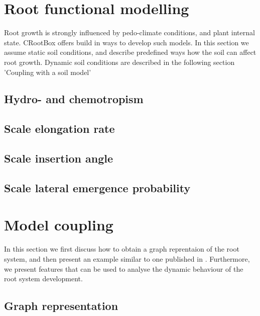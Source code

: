 \documentclass[a4paper]{article}
\begin{document}
\section{Root functional modelling}

Root growth is strongly influenced by pedo-climate conditions, and plant internal state. 
CRootBox offers build in ways to develop such models. 
In this section we assume static soil conditions, and describe predefined ways how the soil can affect root growth.
Dynamic soil conditions are described in the following section 'Coupling with a soil model'

\subsection{Hydro- and chemotropism}



\subsection{Scale elongation rate}



\subsection{Scale insertion angle}

\subsection{Scale lateral emergence probability}



\section{Model coupling}

In this section we first discuss how to obtain a graph reprentaion of the root system, and then present an example similar to one published in \cite{}. 
Furthermore, we present features that can be used to analyse the dynamic behaviour of the root system development.

\subsection{Graph representation}
\end{document}
